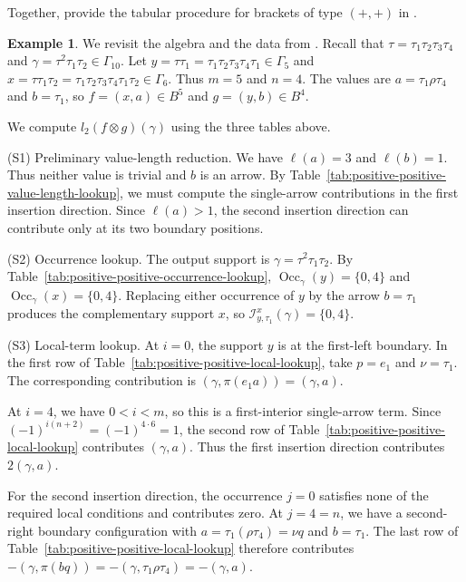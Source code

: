 \documentclass[11pt,a4paper,reqno]{amsart}
\newcommand{\mI}{\mathcal I}
\newcommand{\Occ}{\operatorname{Occ}}
\newcommand{\para}[2]{(#1,#2)}
\theoremstyle{plain}
\theoremstyle{definition}
\newtheorem{example}[example]{Example}
\numberwithin{equation}{section}
\begin{document}
	Together, 
	provide the tabular procedure for brackets of type $(+,+)$ in
	.
	\begin{example}
		\label{ex:appendix-positive-positive-lookup}
		We revisit the algebra and the data from
		.  Recall that
		$\tau=\tau_1\tau_2\tau_3\tau_4$ and
		$\gamma=\tau^2\tau_1\tau_2\in\Gamma_{10}$.  Let
		$y=\tau\tau_1=\tau_1\tau_2\tau_3\tau_4\tau_1\in\Gamma_5$ and
		$x=\tau\tau_1\tau_2=\tau_1\tau_2\tau_3\tau_4\tau_1\tau_2\in\Gamma_6$.
		Thus $m=5$ and $n=4$.  The values are
		$a=\tau_1\rho\tau_4$ and $b=\tau_1$, so
		$f=\para{x}{a}\in B^5$ and $g=\para{y}{b}\in B^4$.
		
		We compute $l_2(f\otimes g)(\gamma)$ using the three tables above.
		
		\medskip
		\noindent
		\textup{(S1) Preliminary value-length reduction.}
		We have $\ell(a)=3$ and $\ell(b)=1$.  Thus neither value is trivial and
		$b$ is an arrow.  By
		Table~\ref{tab:positive-positive-value-length-lookup}, we must compute the
		single-arrow contributions in the first insertion direction.  Since
		$\ell(a)>1$, the second insertion direction can contribute only at its
		two boundary positions.
		
		\medskip
		\noindent
		\textup{(S2) Occurrence lookup.}
		The output support is
		$\gamma=\tau^2\tau_1\tau_2$.  By
		Table~\ref{tab:positive-positive-occurrence-lookup},
		$\Occ_\gamma(y)=\{0,4\}$ and $\Occ_\gamma(x)=\{0,4\}$.
		Replacing either occurrence of $y$ by the arrow $b=\tau_1$ produces the
		complementary support $x$, so
		$\mI_{y,\tau_1}^{x}(\gamma)=\{0,4\}$.
		
		\medskip
		\noindent
		\textup{(S3) Local-term lookup.}
		At $i=0$, the support $y$ is at the first-left boundary.  In the first
		row of Table~\ref{tab:positive-positive-local-lookup}, take $p=e_1$ and
		$\nu=\tau_1$.  The corresponding contribution is
		$\para{\gamma}{\pi(e_1a)}=\para{\gamma}{a}$.
		
		At $i=4$, we have $0<i<m$, so this is a first-interior single-arrow
		term.  Since
		$(-1)^{i(n+2)}=(-1)^{4\cdot6}=1$, the second row of
		Table~\ref{tab:positive-positive-local-lookup} contributes
		$\para{\gamma}{a}$.  Thus the first insertion direction contributes
		$2\para{\gamma}{a}$.
		
		For the second insertion direction, the occurrence $j=0$ satisfies none
		of the required local conditions and contributes zero.  At
		$j=4=n$, we have a second-right boundary configuration with
		$a=\tau_1(\rho\tau_4)=\nu q$ and $b=\tau_1$.  The last row of
		Table~\ref{tab:positive-positive-local-lookup} therefore contributes
		$-\para{\gamma}{\pi(bq)}=-\para{\gamma}{\tau_1\rho\tau_4}
		=-\para{\gamma}{a}$.
		

\end{example}
\end{document}
